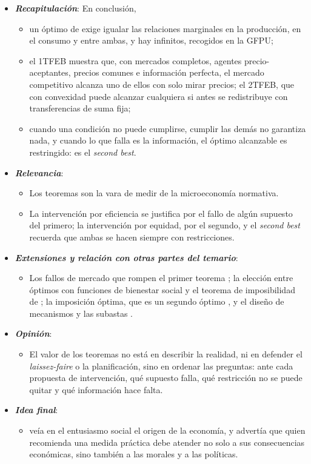 \documentclass[11pt]{article}
\begin{document}
\begin{itemize}
\item \textbf{\emph{Recapitulación}}: En conclusión,
  \begin{itemize}
  \item un óptimo de  exige igualar las relaciones marginales en la producción, en el consumo y entre ambas, y hay infinitos, recogidos en la GFPU;
  \item el 1TFEB muestra que, con mercados completos, agentes precio-aceptantes, precios comunes e información perfecta, el mercado competitivo alcanza uno de ellos con solo mirar precios; el 2TFEB, que con convexidad puede alcanzar cualquiera si antes se redistribuye con transferencias de suma fija;
  \item cuando una condición no puede cumplirse, cumplir las demás no garantiza nada, y cuando lo que falla es la información, el óptimo alcanzable es restringido: es el \emph{second best}.
  \end{itemize}
\item \textbf{\emph{Relevancia}}:
  \begin{itemize}
  \item Los teoremas son la vara de medir de la microeconomía normativa.

  \item La intervención por eficiencia se justifica por el fallo de algún supuesto del primero; la intervención por equidad, por el segundo, y el \emph{second best} recuerda que ambas se hacen siempre con restricciones.
  \end{itemize}
\item \textbf{\emph{Extensiones y relación con otras partes del temario}}:
  \begin{itemize}
  \item Los fallos de mercado que rompen el primer teorema ; la elección entre óptimos con funciones de bienestar social y el teorema de imposibilidad de \textcite{Arrow1951Social} ; la imposición óptima, que es un segundo óptimo , y el diseño de mecanismos y las subastas .
  \end{itemize}
\item \textbf{\emph{Opinión}}:
  \begin{itemize}
  \item El valor de los teoremas no está en describir la realidad, ni en defender el \emph{laissez-faire} o la planificación, sino en ordenar las preguntas: ante cada propuesta de intervención, qué supuesto falla, qué restricción no se puede quitar y qué información hace falta.
  \end{itemize}
\item \textbf{\emph{Idea final}}:
  \begin{itemize}
  \item {} veía en el entusiasmo social el origen de la economía, y  advertía que quien recomienda una medida práctica debe atender no solo a sus consecuencias económicas, sino también a las morales y a las políticas\nocite{Pareto1906Manuale}.


\end{itemize}
\end{itemize}
\end{document}
